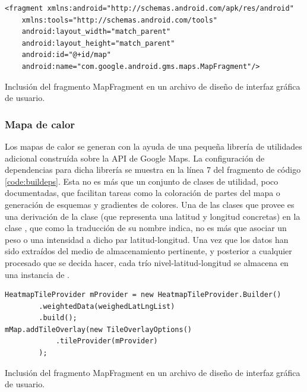 \begin{listing}[h] 
\begin{verbatim}
<fragment xmlns:android="http://schemas.android.com/apk/res/android"
    xmlns:tools="http://schemas.android.com/tools"
    android:layout_width="match_parent"
    android:layout_height="match_parent"
    android:id="@+id/map"
    android:name="com.google.android.gms.maps.MapFragment"/>
\end{verbatim}
\caption{Inclusión del fragmento MapFragment en un archivo de diseño de interfaz gráfica de usuario.}
\label{code:mapfragment}
\end{listing}

\subsubsection{Mapa de calor}
    Los mapas de calor se generan con la ayuda de una pequeña librería de utilidades adicional construída sobre la API de Google Maps. La configuración de dependencias para dicha librería se muestra en la línea 7 del fragmento de código \ref{code:buildeps}. Esta no es más que un conjunto de clases de utilidad, poco documentadas, que facilitan tareas como la coloración de partes del mapa o generación de esquemas y gradientes de colores.
    Una de las clases que provee es una derivación de la clase  (que representa una latitud y longitud concretas) en la clase , que como la traducción de su nombre indica, no es más que asociar un peso o una intensidad a dicho par latitud-longitud.
    Una vez que los datos han sido extraídos del medio de almacenamiento pertinente, y posterior a cualquier procesado que se decida hacer, cada trío nivel-latitud-longitud se almacena en una instancia de . 
        
\begin{listing}[h] 
\begin{verbatim}
HeatmapTileProvider mProvider = new HeatmapTileProvider.Builder()
        .weightedData(weighedLatLngList)
        .build();
mMap.addTileOverlay(new TileOverlayOptions()
            .tileProvider(mProvider)
        );
\end{verbatim}
\caption{Inclusión del fragmento MapFragment en un archivo de diseño de interfaz gráfica de usuario.}
\label{code:heatmap}
\end{listing}

